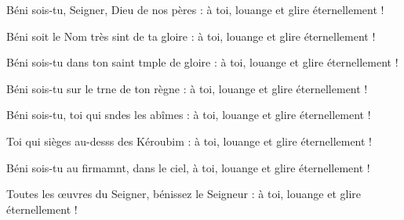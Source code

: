 \item Béni sois-tu, Seigner, Dieu de nos pères :\psstar{} à toi, louange et glire éternellement !
\item Béni soit le Nom très sint de ta gloire :\psstar{} à toi, louange et glire éternellement !
\item Béni sois-tu dans ton saint tmple de gloire :\psstar{} à toi, louange et glire éternellement !
\item Béni sois-tu sur le trne de ton règne :\psstar{} à toi, louange et glire éternellement !
\item Béni sois-tu, toi qui sndes les abîmes :\psstar{} à toi, louange et glire éternellement !
\item Toi qui sièges au-desss des Kéroubim :\psstar{} à toi, louange et glire éternellement !
\item Béni sois-tu au firmamnt, dans le ciel,\psstar{} à toi, louange et glire éternellement !
\item Toutes les œuvres du Seigner, bénissez le Seigneur :\psstar{} à toi, louange et glire éternellement !
